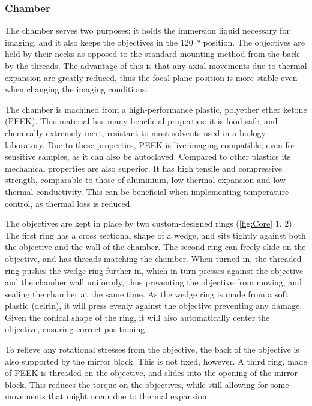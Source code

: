     \subsubsection{Chamber}
    The chamber serves two purposes: it holds the immersion liquid necessary for imaging, and it also keeps the objectives in the \SI{120}{\degree} position. The objectives are held by their necks as opposed to the standard mounting method from the back by the threads. The advantage of this is that any axial movements due to thermal expansion are greatly reduced, thus the focal plane position is more stable even when changing the imaging conditions.

    The chamber is machined from a high-performance plastic, polyether ether ketone (PEEK). This material has many beneficial properties: it is food safe, and chemically extremely inert, resistant to most solvents used in a biology laboratory. Due to these properties, PEEK is live imaging compatible, even for sensitive samples, as it can also be autoclaved. Compared to other plastics its mechanical properties are also superior. It has high tensile and compressive strength, comparable to those of aluminium, low thermal expansion and low thermal conductivity. This can be beneficial when implementing temperature control, as thermal loss is reduced.

    The objectives are kept in place by two custom-designed rings (\autoref{fig:Core} 1, 2). The first ring has a cross sectional shape of a wedge, and sits tightly against both the objective and the wall of the chamber. The second ring can freely slide on the objective, and has threads matching the chamber. When turned in, the threaded ring pushes the wedge ring further in, which in turn presses against the objective and the chamber wall uniformly, thus preventing the objective from moving, and sealing the chamber at the same time. As the wedge ring is made from a soft plastic (delrin), it will press evenly against the objective preventing any damage. Given the conical shape of the ring, it will also automatically center the objective, ensuring correct positioning.

    To relieve any rotational stresses from the objective, the back of the objective is also supported  by the mirror block. This is not fixed, however. A third ring, made of PEEK is threaded on the objective, and slides into the opening of the mirror block. This reduces the torque on the objectives, while still allowing for some movements that might occur due to thermal expansion.

